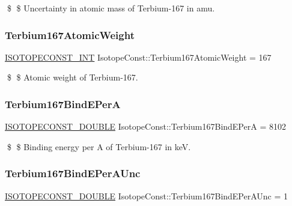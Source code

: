 \$ \$ Uncertainty in atomic mass of Terbium-\/167 in amu. \mbox{\label{group___isotope_const-_terbium-_tb167_gaa0faf0874a959e64070504e49a06d67c}} 
\subsubsection{\texorpdfstring{Terbium167\+Atomic\+Weight}{Terbium167AtomicWeight}}
{\footnotesize\ttfamily \mbox{\hyperlink{group___isotope_const-_macros_ga5f18360b3e99483a35c32d789e62621c}{I\+S\+O\+T\+O\+P\+E\+C\+O\+N\+S\+T\+\_\+\+I\+NT}} Isotope\+Const\+::\+Terbium167\+Atomic\+Weight = 167}

\$ \$ Atomic weight of Terbium-\/167. \mbox{\label{group___isotope_const-_terbium-_tb167_ga71675b3990d72c34cfd8bada7cb2f703}} 
\subsubsection{\texorpdfstring{Terbium167\+Bind\+E\+PerA}{Terbium167BindEPerA}}
{\footnotesize\ttfamily \mbox{\hyperlink{group___isotope_const-_macros_ga8f45a7272ce02c0b4c65c44636ed719a}{I\+S\+O\+T\+O\+P\+E\+C\+O\+N\+S\+T\+\_\+\+D\+O\+U\+B\+LE}} Isotope\+Const\+::\+Terbium167\+Bind\+E\+PerA = 8102}

\$ \$ Binding energy per A of Terbium-\/167 in keV. \mbox{\label{group___isotope_const-_terbium-_tb167_ga972d2bf8f148480fa111a2474f89cc26}} 
\subsubsection{\texorpdfstring{Terbium167\+Bind\+E\+Per\+A\+Unc}{Terbium167BindEPerAUnc}}
{\footnotesize\ttfamily \mbox{\hyperlink{group___isotope_const-_macros_ga8f45a7272ce02c0b4c65c44636ed719a}{I\+S\+O\+T\+O\+P\+E\+C\+O\+N\+S\+T\+\_\+\+D\+O\+U\+B\+LE}} Isotope\+Const\+::\+Terbium167\+Bind\+E\+Per\+A\+Unc = 1}

